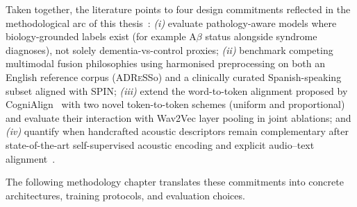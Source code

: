 Taken together, the literature points to four design commitments reflected in the methodological arc of this thesis~\cite{esteve2025speechadppa}: \emph{(i)} evaluate pathology-aware models where biology-grounded labels exist (for example \textsc{A}$\beta$ status alongside syndrome diagnoses), not solely dementia-vs-control proxies; \emph{(ii)} benchmark competing multimodal fusion philosophies using harmonised preprocessing on both an English reference corpus (\textsc{ADReSS}o) and a clinically curated Spanish-speaking subset aligned with SPIN; \emph{(iii)} extend the word-to-token alignment proposed by CogniAlign~\cite{ortiz2025cognialign} with two novel token-to-token schemes (uniform and proportional) and evaluate their interaction with Wav2Vec layer pooling in joint ablations; and \emph{(iv)} quantify when handcrafted acoustic descriptors remain complementary after state-of-the-art self-supervised acoustic encoding and explicit audio--text alignment~\cite{ding2024speechsurvey,ntampakis2025neuroxvocal}.

The following methodology chapter translates these commitments into concrete architectures, training protocols, and evaluation choices.
